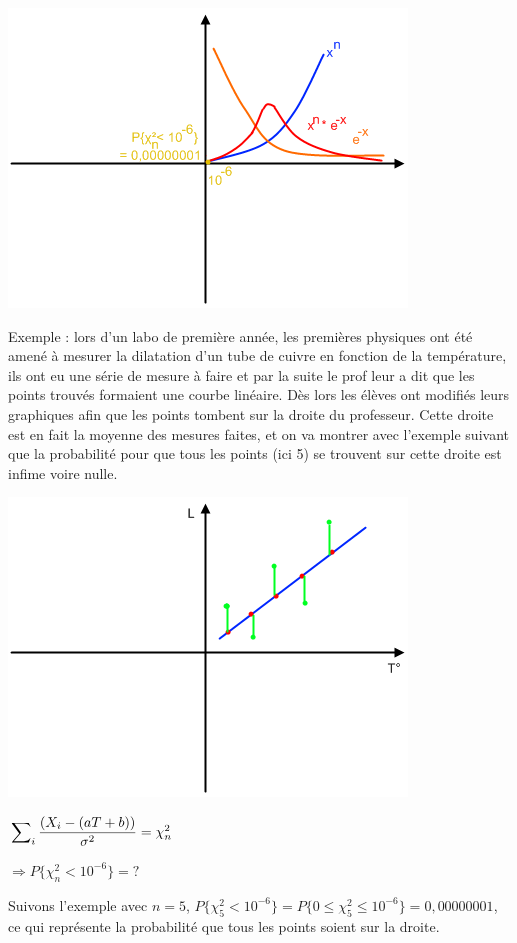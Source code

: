 \documentclass{article}
\begin{document}
\includegraphics{Figure1-3.png}

Exemple : lors d'un labo de première année, les premières physiques ont été amené à mesurer la dilatation d'un tube de cuivre
en fonction de la température, ils ont eu une série de mesure à faire et par la suite le prof leur a dit que les points
trouvés formaient une courbe linéaire. Dès lors les élèves ont modifiés leurs graphiques afin que les points tombent sur la
droite du professeur. Cette droite est en fait la moyenne des mesures faites, et on va montrer avec l'exemple suivant que la
probabilité pour que tous les points (ici 5) se trouvent sur cette droite est infime voire nulle.

\includegraphics{Figure1-4.png}

$\sideset{}{_i}\sum{\dfrac{\left(X_i-(aT+b)\right)}{\sigma^2}} = \chi_n^2$

$\Rightarrow P\{\chi_n^2 < 10^{-6}\} = ?$

Suivons l'exemple avec $n=5$, $P\{\chi_5^2 < 10^{-6}\} = P\{0 \leq \chi_5^2 \leq 10^{-6}\} = 0,00000001$, ce qui représente
la probabilité que tous les points soient sur la droite.
\end{document}

